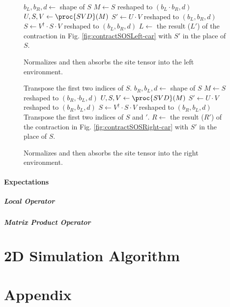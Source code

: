 \documentclass{article}
\begin{document}
\begin{figure}
\begin{codebox}
\li $b_L, b_R, d \gets $ shape of $S$
\li $M \gets S$ reshaped to $(b_L\cdot b_R, d)$
\li $U, S, V \gets \proc{SVD}(M)$
\li $S' \gets U\cdot V$ reshaped to $(b_L,b_R, d)$
\li $S \gets V^\dagger \cdot S \cdot V$ reshaped to $(b_L,b_R, d)$
\li $L \gets $ the result ($L'$) of the contraction in Fig. \ref{fig:contractSOSLeft-car} with $S'$ in the place of $S$.
\end{codebox}
\caption{\label{code:Absorb-Site-Left} Normalizes and then absorbs the site tensor into the left environment.}
\end{figure}

\begin{figure}
\begin{codebox}
\li Transpose the first two indices of $S$.
\li $b_R, b_L, d \gets $ shape of $S$
\li $M \gets S$ reshaped to $(b_R,\cdot b_L, d)$
\li $U, S, V \gets \proc{SVD}(M)$
\li $S' \gets U\cdot V$ reshaped to $(b_R,b_L, d)$
\li $S \gets V^\dagger \cdot S \cdot V$ reshaped to $(b_R,b_L, d)$
\li Transpose the first two indices of $S$ and $'$.
\li $R \gets $ the result ($R'$) of the contraction in Fig. \ref{fig:contractSOSRight-car} with $S'$ in the place of $S$.
\end{codebox}
\caption{\label{code:Absorb-Site-Right} Normalizes and then absorbs the site tensor into the right environment.}
\end{figure}

\subsection{Expectations}

\subsubsection{Local Operator}

\subsubsection{Matrix Product Operator}

\part{2D Simulation Algorithm}
\label{2dsim}

\part{Appendix}
\end{document}
